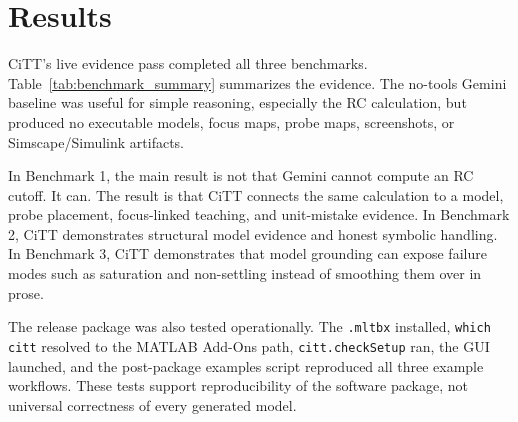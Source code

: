 \section{Results}

CiTT's live evidence pass completed all three benchmarks. Table~\ref{tab:benchmark_summary} summarizes the evidence. The no-tools Gemini baseline was useful for simple reasoning, especially the RC calculation, but produced no executable models, focus maps, probe maps, screenshots, or Simscape/Simulink artifacts.




In Benchmark 1, the main result is not that Gemini cannot compute an RC cutoff. It can. The result is that CiTT connects the same calculation to a model, probe placement, focus-linked teaching, and unit-mistake evidence. In Benchmark 2, CiTT demonstrates structural model evidence and honest symbolic handling. In Benchmark 3, CiTT demonstrates that model grounding can expose failure modes such as saturation and non-settling instead of smoothing them over in prose.

The release package was also tested operationally. The \texttt{.mltbx} installed, \texttt{which citt} resolved to the MATLAB Add-Ons path, \texttt{citt.checkSetup} ran, the GUI launched, and the post-package examples script reproduced all three example workflows. These tests support reproducibility of the software package, not universal correctness of every generated model.
